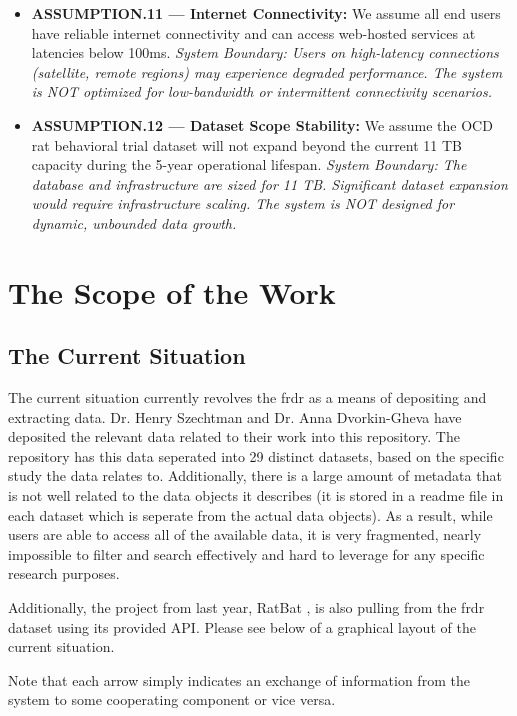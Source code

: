 \documentclass[12pt]{article}
\begin{document}
\begin{itemize}
    \item \textbf{ASSUMPTION.11 --- Internet Connectivity:} We assume all end users have reliable internet connectivity and can access web-hosted services at latencies below 100ms. \textit{System Boundary: Users on high-latency connections (satellite, remote regions) may experience degraded performance. The system is NOT optimized for low-bandwidth or intermittent connectivity scenarios.}
    
    \item \textbf{ASSUMPTION.12 --- Dataset Scope Stability:} We assume the OCD rat behavioral trial dataset will not expand beyond the current 11 TB capacity during the 5-year operational lifespan. \textit{System Boundary: The database and infrastructure are sized for 11 TB. Significant dataset expansion would require infrastructure scaling. The system is NOT designed for dynamic, unbounded data growth.}
\end{itemize}


\section{The Scope of the Work}
\subsection{The Current Situation}

\par{ The current situation currently revolves the \gls{frdr} as a means
of depositing and extracting data. Dr. Henry Szechtman and Dr. Anna Dvorkin-Gheva have
deposited the relevant data related to their work into this repository. The repository
has this data seperated into 29 distinct datasets, based on the specific study the data relates to.
Additionally, there is a large amount of metadata that is not well related to the data objects it describes
(it is stored in a readme file in each dataset which is seperate from the actual data objects). As a result, while
users are able to access all of the available data, it is very fragmented, nearly impossible to filter and search
effectively and hard to leverage for any specific research purposes. \newline\newline

Additionally, the project from last year, RatBat \cite{GitHub_RatBAT}, is also pulling from the \gls{frdr}
dataset using its provided API. Please see below of a graphical layout of the current situation.\newline\newline

\indent Note that each arrow simply indicates an exchange of information from the system to some cooperating component or vice versa.}
\end{document}
